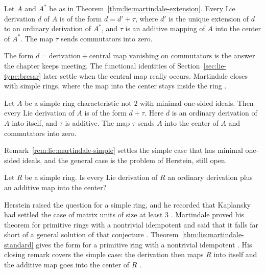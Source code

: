 \begin{theorem}\label{thm:lie:martindale-standard}
Let $A$ and $A^{\ast}$ be as in Theorem~\ref{thm:lie:martindale-extension}. Every Lie
derivation $d$ of $A$ is of the form $d=d'+\tau$, where $d'$ is the unique extension
of $d$ to an ordinary derivation of $A^{\ast}$, and $\tau$ is an additive mapping
of $A$ into the center of $A^{\ast}$. The map $\tau$ sends commutators into zero.
\end{theorem}

The form $d=\text{derivation}+\text{central map vanishing on commutators}$ is the
answer the chapter keeps meeting. %
The functional identities of Section~\ref{sec:lie-type:bresar} later settle when the
central map really occurs.
Martindale closes with simple rings, where the map into the center stays inside
the ring \cite[p.~187]{Martindale1964}.

\begin{remark}\label{rem:lie:martindale-simple}
Let $A$ be a simple ring characteristic not $2$ with minimal one-sided ideals. Then
every Lie derivation of $A$ is of the form $d+\tau$. Here $d$ is an ordinary
derivation of $A$ into itself, and $\tau$ is additive. The map $\tau$ sends $A$
into the center of $A$ and commutators into zero. %
\end{remark}

Remark~\ref{rem:lie:martindale-simple} settles the simple case that has minimal
one-sided ideals, and the general case is the problem of Herstein, still open. %

\begin{problem}\label{prob:open:herstein}
Let $R$ be a simple ring.
Is every Lie derivation of $R$ an ordinary derivation plus an additive map
into the center?
\end{problem}

Herstein raised the question for a simple ring, and he recorded that Kaplansky
had settled the case of matrix units of size at least $3$
\cite[Problem~3, p.~529]{Herstein1961Lie}. Martindale proved his theorem for
primitive rings with a nontrivial idempotent and said that it falls far short
of a general solution of that conjecture \cite[p.~183]{Martindale1964}.
Theorem~\ref{thm:lie:martindale-standard} gives the form for a primitive ring
with a nontrivial idempotent \cite[Theorem~2, p.~187]{Martindale1964}. His
closing remark covers the simple case: the derivation then maps $R$ into
itself and the additive map goes into the center of $R$
\cite[p.~187]{Martindale1964}.

